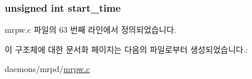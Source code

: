 \subsubsection[{\texorpdfstring{start\+\_\+time}{start_time}}]{\setlength{\rightskip}{0pt plus 5cm}unsigned int start\+\_\+time}\hypertarget{structwtimer_a84903b4395021e776bfb0b9f303b0142}{}\label{structwtimer_a84903b4395021e776bfb0b9f303b0142}


mrpw.\+c 파일의 63 번째 라인에서 정의되었습니다.



이 구조체에 대한 문서화 페이지는 다음의 파일로부터 생성되었습니다.\+:\begin{DoxyCompactItemize}
\item 
daemons/mrpd/\hyperlink{mrpw_8c}{mrpw.\+c}\end{DoxyCompactItemize}
